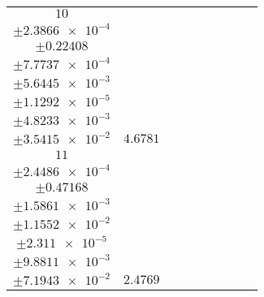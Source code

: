 \documentclass[8pt]{article}
\begin{document}
\begin{longtable}[l]{c c c c c c c c c}
$\num{10}$ & \begin{tabular}[c]{@{}c@{}}$\num{6.1545e-2}$ \\ $\pm\num{2.3866e-4}$\end{tabular} & \begin{tabular}[c]{@{}c@{}}$\num{-8.7922e-2}$ \\ $\pm\num{0.22408}$\end{tabular} & \begin{tabular}[c]{@{}c@{}}$\num{-4.2321}$ \\ $\pm\num{7.7737e-4}$\end{tabular} & \begin{tabular}[c]{@{}c@{}}$\num{2.1392e+3}$ \\ $\pm\num{5.6445e-3}$\end{tabular} & \begin{tabular}[c]{@{}c@{}}$\num{4.2796}$ \\ $\pm\num{1.1292e-5}$\end{tabular} & \begin{tabular}[c]{@{}c@{}}$\num{1.1879}$ \\ $\pm\num{4.8233e-3}$\end{tabular} & \begin{tabular}[c]{@{}c@{}}$\num{4.1537}$ \\ $\pm\num{3.5415e-2}$\end{tabular} & $\num{4.6781}$\\
$\num{11}$ & \begin{tabular}[c]{@{}c@{}}$\num{3.0133e-2}$ \\ $\pm\num{2.4486e-4}$\end{tabular} & \begin{tabular}[c]{@{}c@{}}$\num{-0.18545}$ \\ $\pm\num{0.47168}$\end{tabular} & \begin{tabular}[c]{@{}c@{}}$\num{-0.91063}$ \\ $\pm\num{1.5861e-3}$\end{tabular} & \begin{tabular}[c]{@{}c@{}}$\num{2.1425e+3}$ \\ $\pm\num{1.1552e-2}$\end{tabular} & \begin{tabular}[c]{@{}c@{}}$\num{4.2863}$ \\ $\pm\num{2.311e-5}$\end{tabular} & \begin{tabular}[c]{@{}c@{}}$\num{1.1653}$ \\ $\pm\num{9.8811e-3}$\end{tabular} & \begin{tabular}[c]{@{}c@{}}$\num{4.0864}$ \\ $\pm\num{7.1943e-2}$\end{tabular} & $\num{2.4769}$\\

\end{longtable}
\end{document}
